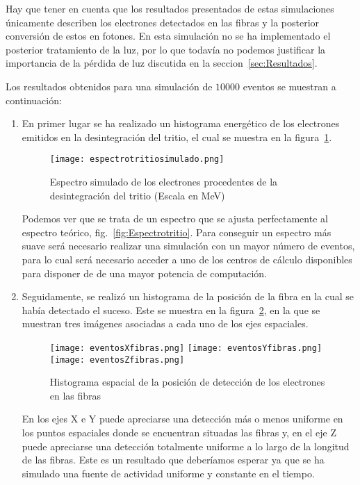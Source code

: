 Hay que tener en cuenta que los resultados presentados de estas simulaciones únicamente describen los electrones detectados en las fibras y la posterior conversión de estos en fotones. En esta simulación no se ha implementado el posterior tratamiento de la luz, por lo que todavía no podemos justificar la importancia de la pérdida de luz discutida en la seccion~\ref{sec:Resultados}.

Los resultados obtenidos para una simulación de $10000$ eventos se muestran a continuación:
\begin{enumerate}
\item{} En primer lugar se ha realizado un histograma energético de los electrones emitidos en la desintegración del tritio, el cual se muestra en la figura~\ref{espectrotritiosimulado}.

\begin{figure}[hbtp]
\centering
\texttt{[image: espectrotritiosimulado.png]}
\caption{Espectro simulado de los electrones procedentes de la desintegración del tritio (Escala en MeV)\label{espectrotritiosimulado}}
\end{figure}

Podemos ver que se trata de un espectro que se ajusta perfectamente al espectro teórico, fig.~\ref{fig:Espectrotritio}. Para conseguir un espectro más suave será necesario realizar una simulación con un mayor número de eventos, para lo cual será necesario acceder a uno de los centros  de cálculo disponibles para disponer de de una mayor potencia de computación.

\item{} Seguidamente, se realizó un histograma de la posición de la fibra en la cual se había detectado el suceso. Este se muestra en la  figura~\ref{espectroespacial}, en la que se muestran tres imágenes asociadas a cada uno de los ejes espaciales.

\begin{figure}[htb]
\centering
{
\texttt{[image: eventosXfibras.png]} 
}
{
\texttt{[image: eventosYfibras.png]} 
}
{
\texttt{[image: eventosZfibras.png]} 
}
\caption{Histograma espacial de la posición de detección de los electrones en las fibras\label{espectroespacial}}
\end{figure}

En los ejes X e Y puede apreciarse una detección más o menos uniforme en los puntos espaciales donde se encuentran situadas las fibras y, en el eje Z puede apreciarse una detección totalmente uniforme a lo largo de la longitud de las fibras. Este es un resultado que deberíamos esperar ya que se ha simulado una fuente de actividad uniforme y constante en el tiempo.


\end{enumerate}
